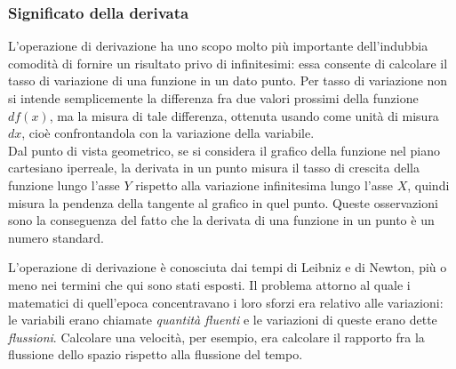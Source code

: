 \subsubsection{Significato della derivata}
L'operazione di derivazione ha uno scopo molto più importante 
dell'indubbia comodità di fornire un risultato privo di infinitesimi:
essa consente di calcolare il tasso di variazione di una funzione in un 
dato punto. Per tasso di variazione non si intende semplicemente la differenza
fra due valori prossimi della funzione $df(x)$, ma la misura di tale 
differenza, ottenuta usando come unità di misura $dx$, cioè confrontandola
con la variazione della variabile.\\
Dal punto di vista geometrico, se si considera il grafico della funzione nel 
piano cartesiano iperreale, la derivata in un punto misura il tasso di crescita
della funzione lungo l'asse $Y$ rispetto alla variazione infinitesima lungo 
l'asse $X$, quindi misura la pendenza della tangente al grafico in quel punto.
Queste osservazioni sono la conseguenza del fatto che la derivata di una funzione 
in un punto è un numero standard.

\begin{osservazione}
 L'operazione di derivazione è conosciuta dai tempi di Leibniz e di Newton, 
 più o meno nei termini che qui sono stati esposti. Il problema attorno al 
 quale i matematici di quell'epoca concentravano i loro sforzi era
 relativo alle variazioni: le variabili erano chiamate 
 \emph{quantità fluenti}  e le variazioni di queste erano dette 
 \emph{flussioni}.
 Calcolare una velocità, per esempio, era calcolare il rapporto
 fra la flussione dello spazio rispetto alla flussione del tempo.
\end{osservazione}

